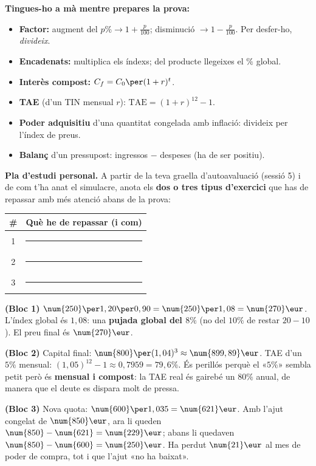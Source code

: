 \begin{idea}
\textbf{Tingues-ho a mà mentre prepares la prova:}
\begin{itemize}[leftmargin=1.4em, itemsep=2pt]
  \item \textbf{Factor:} augment del $p\%\rightarrow 1+\frac{p}{100}$; disminució
        $\rightarrow 1-\frac{p}{100}$. Per desfer-ho, \emph{divideix}.
  \item \textbf{Encadenats:} multiplica els índexs; del producte llegeixes el $\%$
        global.
  \item \textbf{Interès compost:} $C_f=C_0\per (1+r)^t$.
  \item \textbf{TAE} (d'un TIN mensual $r$): $\text{TAE}=(1+r)^{12}-1$.
  \item \textbf{Poder adquisitiu} d'una quantitat congelada amb inflació: divideix per
        l'índex de preus.
  \item \textbf{Balanç} d'un pressupost: ingressos $-$ despeses (ha de ser positiu).
\end{itemize}
\end{idea}

\noindent\textbf{Pla d'estudi personal.} A partir de la teva graella d'autoavaluació
(sessió 5) i de com t'ha anat el simulacre, anota els \textbf{dos o tres tipus
d'exercici} que has de repassar amb més atenció abans de la prova:
\begin{center}
\renewcommand{\arraystretch}{1.5}
\begin{tabular}{c p{10.5cm}}
\toprule
\textbf{\#} & \textbf{Què he de repassar (i com)} \\
\midrule
1 & \rule{9.8cm}{0.4pt} \\
2 & \rule{9.8cm}{0.4pt} \\
3 & \rule{9.8cm}{0.4pt} \\
\bottomrule
\end{tabular}
\end{center}

\begin{solucions}
\begin{sollist}
  \item \textbf{(Bloc 1)} $\num{250}\per 1,20\per 0,90=\num{250}\per 1,08=\num{270}\eur$.
        L'índex global és $1,08$: una \textbf{pujada global del $8\%$} (no del $10\%$ de
        restar $20-10$). El preu final és $\num{270}\eur$.
  \item \textbf{(Bloc 2)} Capital final:
        $\num{800}\per (1,04)^3\approx\num{899,89}\eur$. TAE d'un $5\%$ mensual:
        $(1,05)^{12}-1\approx 0,7959=79,6\%$. És perillós perquè el «$5\%$» sembla petit
        però és \textbf{mensual i compost}: la TAE real és gairebé un $80\%$ anual, de
        manera que el deute es dispara molt de pressa.
  \item \textbf{(Bloc 3)} Nova quota: $\num{600}\per 1,035=\num{621}\eur$. Amb l'ajut
        congelat de $\num{850}\eur$, ara li queden $\num{850}-\num{621}=\num{229}\eur$;
        abans li quedaven $\num{850}-\num{600}=\num{250}\eur$. Ha perdut $\num{21}\eur$
        al mes de poder de compra, tot i que l'ajut «no ha baixat».
\end{sollist}
\end{solucions}
